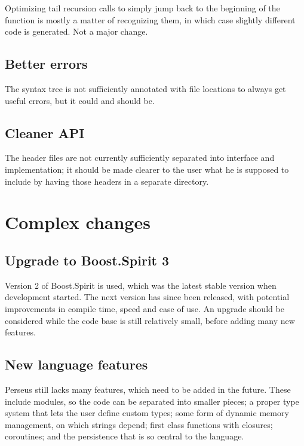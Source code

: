 		Optimizing tail recursion calls to simply jump back to the beginning of the function is mostly a matter of recognizing them, in which case slightly different code is generated. Not a major change.
		
		\subsection{Better errors}
		
		The syntax tree is not sufficiently annotated with file locations to always get useful errors, but it could and should be.
		
		\subsection{Cleaner API}
		
		The header files are not currently sufficiently separated into interface and implementation; it should be made clearer to the user what he is supposed to include by having those headers in a separate directory.
	
	\section{Complex changes}
		
		\subsection{Upgrade to Boost.Spirit 3}
		
		Version 2 of Boost.Spirit is used, which was the latest stable version when development started. The next version has since been released, with potential improvements in compile time, speed and ease of use. An upgrade should be considered while the code base is still relatively small, before adding many new features.
		
		\subsection{New language features}
		
		Perseus still lacks many features, which need to be added in the future. These include modules, so the code can be separated into smaller pieces; a proper type system that lets the user define custom types; some form of dynamic memory management, on which strings depend; first class functions with closures; coroutines; and the persistence that is so central to the language.
